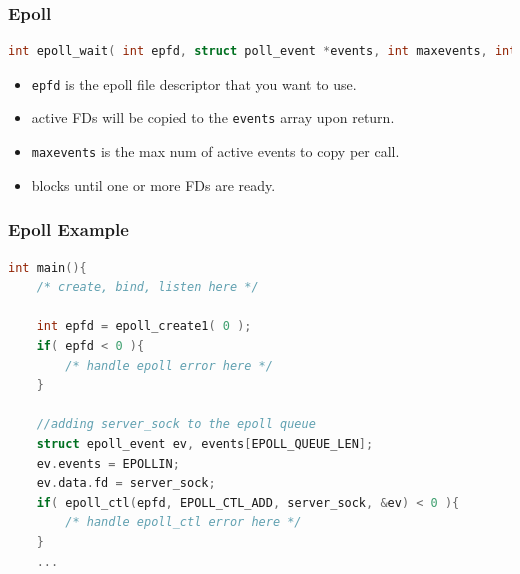 \documentclass[aspectratio=43]{beamer}
\begin{document}
\begin{frame}[fragile]
  \frametitle{Epoll}
  
    \begin{lstlisting}[language=C++,basicstyle=\ttfamily\footnotesize,commentstyle=\color{commgreen},keywordstyle=\color{blue},breaklines=true]
int epoll_wait( int epfd, struct poll_event *events, int maxevents, int timeout );
\end{lstlisting}

\begin{itemize}
\item {\tt epfd} is the epoll file descriptor that you want to use.
\item active FDs will be copied to the {\tt events} array upon return.
\item {\tt maxevents} is the max num of active events to copy per call.
\item blocks until one or more FDs are ready.
\end{itemize}
\end{frame}

\begin{frame}[fragile]
  \frametitle{Epoll Example}
\begin{lstlisting}[language=C++,basicstyle=\ttfamily\footnotesize,commentstyle=\color{commgreen},keywordstyle=\color{blue},breaklines=true]
int main(){
    /* create, bind, listen here */
    
    int epfd = epoll_create1( 0 );
    if( epfd < 0 ){
        /* handle epoll error here */
    }

    //adding server_sock to the epoll queue
    struct epoll_event ev, events[EPOLL_QUEUE_LEN];
    ev.events = EPOLLIN;
    ev.data.fd = server_sock;
    if( epoll_ctl(epfd, EPOLL_CTL_ADD, server_sock, &ev) < 0 ){
        /* handle epoll_ctl error here */
    }
    ...
   \end{lstlisting}
\end{frame}
\end{document}
